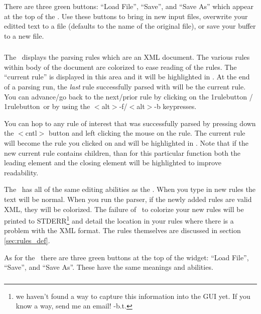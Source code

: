 There are three green buttons: ``Load File'', ``Save'', and ``Save As'' 
which appear at the top of the  .
Use these buttons to bring in new input files, overwrite your editted text
to a file (defaults to the name of the original file),
or save your buffer to a new file.

\subsubsection{ }
\label{sec:rulestextarea}

The \ displays the parsing rules which are an XML document.
The various rules within body of the document are colorized to ease
reading of the rules.  The ``current rule'' is displayed in this area
and it will be highlighted in \currentrulecolor . At the end of a parsing
run, the {\em last} rule successfully parsed with will be the current rule.
You can advance/go back to the next/prior rule by clicking on the 
\forward1rulebutton / \back1rulebutton\ or by using 
the $<$alt$>$-f/$<$alt$>$-b keypresses.  

You can hop to any rule of interest that was successfully parsed
by pressing down the $<$cntl$>$ button and left clicking the mouse 
on the rule. 
The current rule will become the rule you clicked on 
and will be highlighted in \clickhighlightrulecolor .
Note that if the new current rule contains 
children, than for this particular function both the leading element and 
the closing element will be
highlighted to improve readability.


The \ has all of the same editing abilities as the 
 . When you type in new rules the text will be normal. 
When you run the parser, if the newly added rules are valid XML, they
will be colorized. The failure of \program\ to colorize your new
rules will be printed to STDERR\footnote{we haven't found a way to capture
this information into the GUI yet. If you know a way, send me an email!
-b.t. \bugmail} and detail the location in your rules where there is 
a problem with the XML format.
The rules themselves are discussed in section \ref{sec:rules_def}. 

As for the \ there are three green buttons at the top
of the widget: ``Load File'', ``Save'', and ``Save As''. These have the
same meanings and abilities.

\subsubsection{\outputtextarea }

